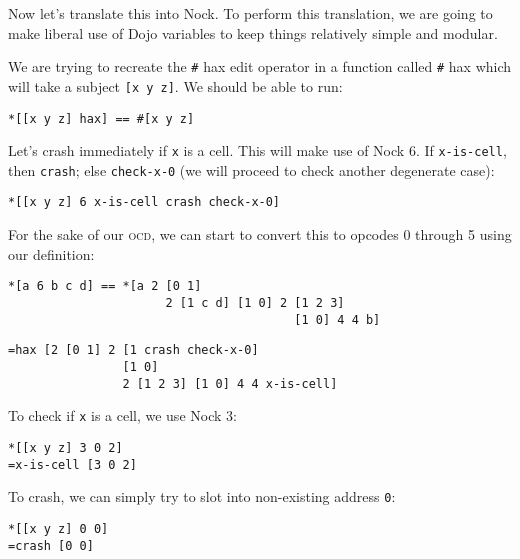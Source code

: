 \documentclass[twoside]{article}
\begin{document}
Now let's translate this into Nock.  To perform this translation, we are going to make liberal use of Dojo variables to keep things relatively simple and modular.

We are trying to recreate the \lstinline[style=inlinecode]{#} hax edit operator in a function called \lstinline[style=inlinecode]{#} hax which will take a subject \lstinline[style=inlinecode]{[x y z]}.  We should be able to run:

\begin{lstlisting}[style=listingblock]
*[[x y z] hax] == #[x y z]
\end{lstlisting}

\noindent
Let's crash immediately if \lstinline[style=inlinecode]{x} is a cell. This will make use of Nock 6. If \lstinline[style=inlinecode]{x-is-cell}, then \lstinline[style=inlinecode]{crash}; else \lstinline[style=inlinecode]{check-x-0} (we will proceed to check another degenerate case):

\begin{lstlisting}[style=listingblock]
*[[x y z] 6 x-is-cell crash check-x-0]
\end{lstlisting}

\noindent
For the sake of our \textsc{ocd}, we can start to convert this to opcodes 0 through 5 using our definition:

\begin{lstlisting}[style=listingcode]
*[a 6 b c d] == *[a 2 [0 1]
                      2 [1 c d] [1 0] 2 [1 2 3]
                                        [1 0] 4 4 b]
\end{lstlisting}

\begin{lstlisting}[style=listingblock]
=hax [2 [0 1] 2 [1 crash check-x-0]
                [1 0]
                2 [1 2 3] [1 0] 4 4 x-is-cell]
\end{lstlisting}

\noindent
To check if \lstinline[style=inlinecode]{x} is a cell, we use Nock 3:

\begin{lstlisting}[style=listingblock]
*[[x y z] 3 0 2]
=x-is-cell [3 0 2]
\end{lstlisting}

\noindent
To crash, we can simply try to slot into non-existing address \lstinline[style=inlinecode]{0}:

\begin{lstlisting}[style=listingblock]
*[[x y z] 0 0]
=crash [0 0]
\end{lstlisting}
\end{document}
